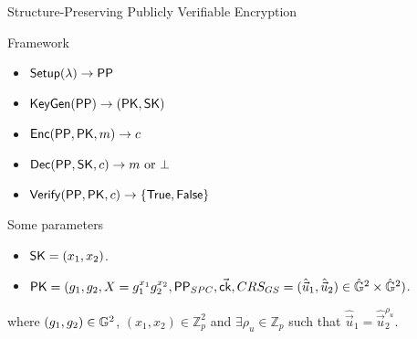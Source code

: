 \begin{frame}{Structure-Preserving Publicly Verifiable Encryption}
  \begin{block}{Framework}
    \begin{itemize}
    \item ${\mathsf{Setup}}(\lambda) \to \mathsf{PP}$
    \item ${\mathsf{KeyGen}}(\mathsf{PP}) \to (\mathsf{PK}, \mathsf{SK})$
    \item ${\mathsf{Enc}}(\mathsf{PP}, \mathsf{PK}, m) \to c$
    \item ${\mathsf{Dec}}(\mathsf{PP}, \mathsf{SK}, c) \to m \mbox{ or } \bot$
    \item ${\mathsf{Verify}}(\mathsf{PP}, \mathsf{PK}, c) \to \{\mathsf{True}, \mathsf{False}\}$
    \end{itemize}
  \end{block}
  \pause
  \begin{block}{Some parameters}
    
    \begin{itemize}
    \item $\mathsf{SK} = (x_1, x_2)$.
    \item $\mathsf{PK} = (g_1, g_2, X = g_1^{x_1}g_2^{x_2}, \mathsf{PP}_{SPC}, \vec{\mathsf{ck}}, CRS_{GS} = (\hat{\vec{u}}_1, \hat{\vec{u}}_2) \in \hat{\mathbb{G}}^2 \times \hat{\mathbb{G}}^2)$.
    \end{itemize}
    where $(g_1, g_2) \in \mathbb{G}^2$, $(x_1, x_2) \in \mathbb{Z}_p^2$ and $\exists \rho_u \in \mathbb{Z}_p$ such that $\hat{\vec{u}}_1 = \hat{\vec{u}}_2^{\rho_u}$.
  \end{block}
  
\end{frame}

